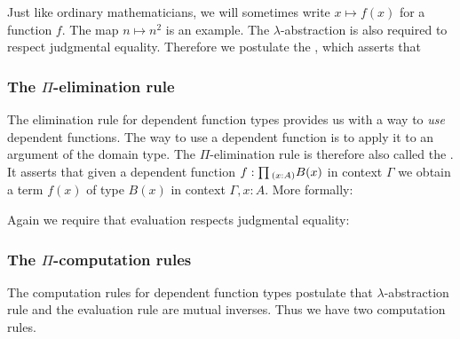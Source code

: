 Just like ordinary mathematicians, we will sometimes write $x\mapsto f(x)$ for a function $f$. The map $n\mapsto n^2$ is an example. The $\lambda$-abstraction is also required to respect judgmental equality. Therefore we postulate the ,
which asserts that
\begin{prooftree}
\end{prooftree}

\subsubsection{The $\Pi$-elimination rule}

The elimination rule for dependent function types provides us with a way to \emph{use} dependent functions. The way to use a dependent function is to apply it to an argument of the domain type. The $\Pi$-elimination rule is therefore also called the . It asserts that given a dependent function $f:\prd{x:A}B(x)$ in context $\Gamma$ we obtain a term $f(x)$ of type $B(x)$ in context $\Gamma,x:A$. More formally:
\begin{prooftree}
\end{prooftree}
Again we require that evaluation respects judgmental equality:
\begin{prooftree}
\end{prooftree}

\subsubsection{The $\Pi$-computation rules}

The computation rules for dependent function types postulate that $\lambda$-abstraction rule and the evaluation rule are mutual inverses. Thus we have two computation rules.

